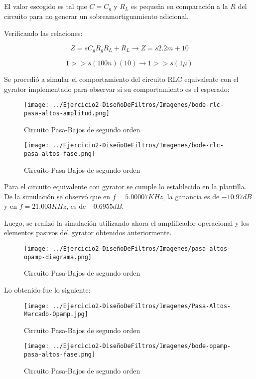 El valor escogido es tal que $C=C_g$ y $R_L$ es pequeña en comparación a la $R$ del circuito para no generar
un sobreamortiguamiento adicional.

Verificando las relaciones:

$$Z=sC_gR_gR_L+R_L \longrightarrow Z = s2.2m + 10$$

$$1 >> s(100n)(10) \longrightarrow 1  >> s(1\mu)$$

Se procedió a simular el comportamiento del circuito RLC equivalente con el gyrator implementado para observar si su comportamiento es el esperado:


\begin{figure}[H]
    \centering
    \texttt{[image: ../Ejercicio2-DiseñoDeFiltros/Imagenes/bode-rlc-pasa-altos-amplitud.png]}
    \caption{Circuito Pasa-Bajos de segundo orden}
\end{figure}

\begin{figure}[H]
    \centering
    \texttt{[image: ../Ejercicio2-DiseñoDeFiltros/Imagenes/bode-rlc-pasa-altos-fase.png]}
    \caption{Circuito Pasa-Bajos de segundo orden}
\end{figure}

Para el circuito equivalente con gyrator se cumple lo establecido en la plantilla.
De la simulación se observó que en $f=5.00007 KHz$, la ganancia es de $-10.97 dB$ y en $f=21.003KHz$, es de $-0.6955 dB$.

Luego, se realizó la simulación utilizando ahora el amplificador operacional y los elementos pasivos del gyrator obtenidos anteriormente.

\begin{figure}[H]
    \centering
    \texttt{[image: ../Ejercicio2-DiseñoDeFiltros/Imagenes/pasa-altos-opamp-diagrama.png]}
    \caption{Circuito Pasa-Bajos de segundo orden}
\end{figure}

Lo obtenido fue lo siguiente:

\begin{figure}[H]
    \centering
    \texttt{[image: ../Ejercicio2-DiseñoDeFiltros/Imagenes/Pasa-Altos-Marcado-Opamp.jpg]}
    \caption{Circuito Pasa-Bajos de segundo orden}
\end{figure}

\begin{figure}[H]
    \centering
    \texttt{[image: ../Ejercicio2-DiseñoDeFiltros/Imagenes/bode-opamp-pasa-altos-fase.png]}
    \caption{Circuito Pasa-Bajos de segundo orden}
\end{figure}

